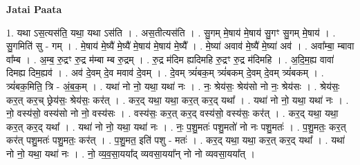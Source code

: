 \documentclass[17pt]{extarticle}
\begin{document}
\textbf{Jatai Paata} \newline

1. यथा ऽस॒त्यस॑ति॒ यथा॒ यथा ऽस॑ति । . अस॒तीत्यस॑ति । . सु॒गम् मे॒षाय॑ मे॒षाय॑ सु॒गꣳ सु॒गम् मे॒षाय॑ । . सु॒गमिति॑ सु - गम् । . मे॒षाय॑ मे॒ष्यै॑ मे॒ष्यै॑ मे॒षाय॑ मे॒षाय॑ मे॒ष्यै᳚ । . मे॒ष्या॑ अवाव॑ मे॒ष्यै॑ मे॒ष्या॑ अव॑ । . अवा᳚म्बा॒ म्बावा वा᳚म्ब । . अ॒म्ब॒ रु॒द्रꣳ रु॒द्र म॑म्बा म्ब रु॒द्रम् । . रु॒द्र म॑दिम ह्यदिमहि रु॒द्रꣳ रु॒द्र म॑दिमहि । . अ॒दि॒म॒ह्य वावा॑ दिमह्य दिम॒ह्यव॑ । . अव॑ दे॒वम् दे॒व मवाव॑ दे॒वम् । . दे॒वम् त्र्यं॑बक॒म् त्र्यं॑बकम् दे॒वम् दे॒वम् त्र्यं॑बकम् । . त्र्यं॑बक॒मिति॒ त्रि - अं॒ब॒क॒म् । . यथा॑ नो नो॒ यथा॒ यथा॑ नः । . नः॒ श्रेय॑सः॒ श्रेय॑सो नो नः॒ श्रेय॑सः । . श्रेय॑सः॒ कर॒त् कर॒च् छ्रेय॑सः॒ श्रेय॑सः॒ कर॑त् । . कर॒द् यथा॒ यथा॒ कर॒त् कर॒द् यथा᳚ । . यथा॑ नो नो॒ यथा॒ यथा॑ नः । . नो॒ वस्य॑सो॒ वस्य॑सो नो नो॒ वस्य॑सः । . वस्य॑सः॒ कर॒त् कर॒द् वस्य॑सो॒ वस्य॑सः॒ कर॑त् । . कर॒द् यथा॒ यथा॒ कर॒त् कर॒द् यथा᳚ । . यथा॑ नो नो॒ यथा॒ यथा॑ नः । . नः॒ प॒शु॒मतः॑ पशु॒मतो॑ नो नः पशु॒मतः॑ । . प॒शु॒मतः॒ कर॒त् कर॑त् पशु॒मतः॑ पशु॒मतः॒ कर॑त् । . प॒शु॒मत॒ इति॑ पशु - मतः॑ । . कर॒द् यथा॒ यथा॒ कर॒त् कर॒द् यथा᳚ । . यथा॑ नो नो॒ यथा॒ यथा॑ नः । . नो॒ व्य॒व॒सा॒यया᳚द् व्यवसा॒यया᳚न् नो नो व्यवसा॒यया᳚त् । \newline
\end{document}

